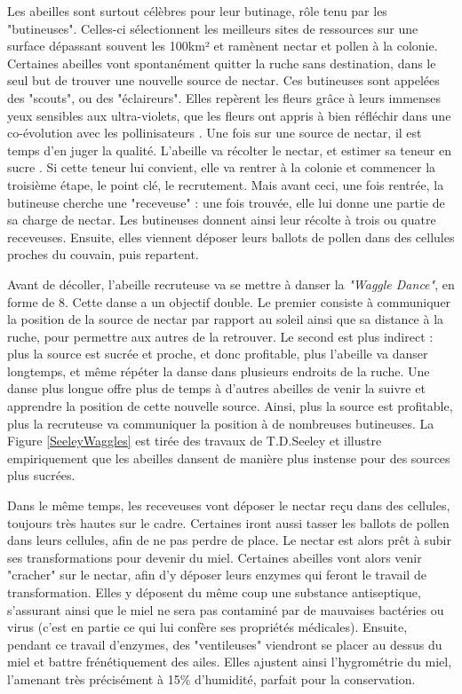 			Les abeilles sont surtout célèbres pour leur butinage, rôle tenu par les "butineuses". Celles-ci sélectionnent les meilleurs sites de ressources sur une surface dépassant souvent les 100km² \cite{seeley_wisdom_1995} et ramènent nectar et pollen à la colonie. Certaines abeilles vont spontanément quitter la ruche sans destination, dans le seul but de trouver une nouvelle source de nectar. Ces butineuses sont appelées des "scouts", ou des "éclaireurs". Elles repèrent les fleurs grâce à leurs immenses yeux sensibles aux ultra-violets, que les fleurs ont appris à bien réfléchir dans une co-évolution avec les pollinisateurs \cite{thompson_concepts_1989}. Une fois sur une source de nectar, il est temps d'en juger la qualité. L'abeille va récolter le nectar, et estimer sa teneur en sucre \cite{seeley_wisdom_1995}. Si cette teneur lui convient, elle va rentrer à la colonie et commencer la troisième étape, le point clé, le recrutement. Mais avant ceci, une fois rentrée, la butineuse cherche une "receveuse" : une fois trouvée, elle lui donne une partie de sa charge de nectar. Les butineuses donnent ainsi leur récolte à trois ou quatre receveuses. Ensuite, elles viennent déposer leurs ballots de pollen dans des cellules proches du couvain, puis repartent. 
	
	Avant de décoller, l'abeille recruteuse va se mettre à danser la \textit{"Waggle Dance"}, en forme de 8. Cette danse a un objectif double. Le premier consiste à communiquer la position de la source de nectar par rapport au soleil ainsi que sa distance à la ruche, pour permettre aux autres de la retrouver. Le second est plus indirect : plus la source est sucrée et proche, et donc profitable, plus l'abeille va danser longtemps, et même répéter la danse dans plusieurs endroits de la ruche. Une danse plus longue offre plus de temps à d'autres abeilles de venir la suivre et apprendre la position de cette nouvelle source. Ainsi, plus la source est profitable, plus la recruteuse va communiquer la position à de nombreuses butineuses. La Figure \ref{SeeleyWaggles} est tirée des travaux de T.D.Seeley \cite{seeley_wisdom_1995} et illustre empiriquement que les abeilles dansent de manière plus instense pour des sources plus sucrées.
			
			Dans le même temps, les receveuses vont déposer le nectar reçu dans des cellules, toujours très hautes sur le cadre. Certaines iront aussi tasser les ballots de pollen dans leurs cellules, afin de ne pas perdre de place. Le nectar est alors prêt à subir ses transformations pour devenir du miel. Certaines abeilles vont alors venir "cracher" sur le nectar, afin d'y déposer leurs enzymes qui feront le travail de transformation. Elles y déposent du même coup une substance antiseptique, s'assurant ainsi que le miel ne sera pas contaminé par de mauvaises bactéries ou virus (c'est en partie ce qui lui confère ses propriétés médicales). Ensuite, pendant ce travail d'enzymes, des "ventileuses" viendront se placer au dessus du miel et battre frénétiquement des ailes. Elles ajustent ainsi l'hygrométrie du miel, l'amenant très précisément à 15\% d'humidité, parfait pour la conservation.
			
